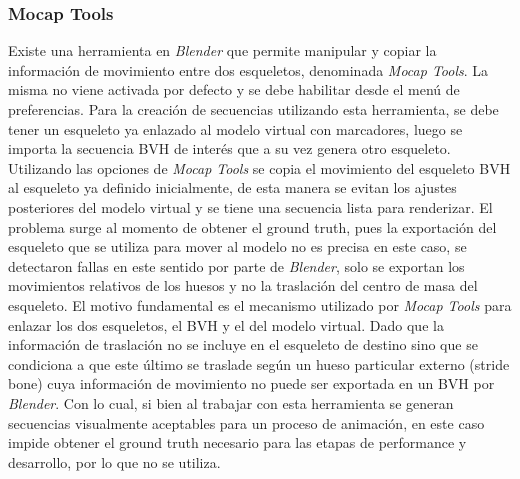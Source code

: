 \subsubsection*{Mocap Tools}

Existe una herramienta en \textit{Blender} que permite manipular y copiar la información de movimiento entre dos esqueletos, denominada \textit{Mocap Tools}. La misma no viene activada por defecto y se debe habilitar desde el menú de preferencias. Para la creación de secuencias utilizando esta herramienta, se debe tener un esqueleto ya enlazado al modelo virtual con marcadores, luego se importa la secuencia BVH de interés que a su vez genera otro esqueleto. Utilizando las opciones de \textit{Mocap Tools}  se copia el movimiento del esqueleto BVH al esqueleto ya definido inicialmente, de esta manera se evitan los ajustes posteriores del modelo virtual y se tiene una secuencia lista para renderizar. 
El problema surge al momento de obtener el ground truth, pues la exportación del esqueleto que se utiliza para mover al modelo no es precisa en este caso, se detectaron fallas en este sentido por parte de \textit{Blender}, solo se exportan los movimientos relativos de los huesos y no la traslación del centro de masa del esqueleto. El motivo fundamental es el mecanismo utilizado por \textit{Mocap Tools} para enlazar los dos esqueletos, el BVH y el del modelo virtual. Dado que la información de traslación no se incluye en el esqueleto de destino sino que se condiciona a que este último se traslade según un hueso particular externo (\textsf{stride bone})  cuya información de movimiento no puede ser exportada en un BVH por \textit{Blender}. Con lo cual, si bien al trabajar con esta herramienta se generan secuencias visualmente aceptables para un proceso de animación, en este caso impide obtener el ground truth necesario para las etapas de performance y desarrollo, por lo que no se utiliza.
 
    






